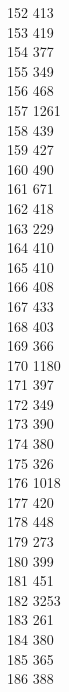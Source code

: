 { 152	413 \\
 153	419 \\
 154	377 \\
 155	349 \\
 156	468 \\
 157	1261 \\
 158	439 \\
 159	427 \\
 160	490 \\
 161	671 \\
 162	418 \\
 163	229 \\
 164	410 \\
 165	410 \\
 166	408 \\
 167	433 \\
 168	403 \\
 169	366 \\
 170	1180 \\
 171	397 \\
 172	349 \\
 173	390 \\
 174	380 \\
 175	326 \\
 176	1018 \\
 177	420 \\
 178	448 \\
 179	273 \\
 180	399 \\
 181	451 \\
 182	3253 \\
 183	261 \\
 184	380 \\
 185	365 \\
 186	388 \\
}
